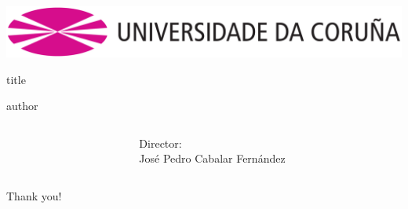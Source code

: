 \documentclass[english]{beamer}
\newcommand{\director}{Director:\\José Pedro Cabalar Fernández}
\begin{document}
\begin{frame}
\centering
\vfill
\includegraphics[width=0.6\linewidth]{imagenes/anagramaUDC.png}
\vfill
\begin{beamercolorbox}[rounded=true,shadow=true,sep=8pt,center]{title}
\inserttitle \par
\end{beamercolorbox}
\vfill
\begin{beamercolorbox}[leftskip=8cm,center,wd=0.7\textwidth]{author}
\begin{columns}[T]
\begin{column}{.49\textwidth}%
\centering
\insertauthor
\end{column}
\begin{column}{.49\textwidth}%
\centering
\director
\end{column}
\end{columns}
\end{beamercolorbox}
\centering
\vfill
Thank you!
\vfill
\insertdate\par
\vfill
\end{frame}
\end{document}
